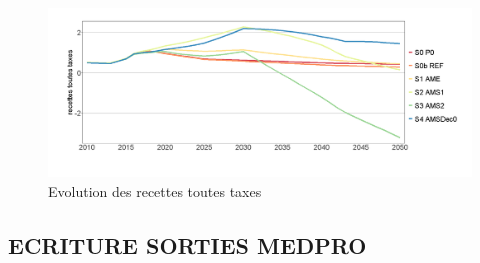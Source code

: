 \documentclass[]{article}
\begin{document}
\begin{figure}
\centering
\includegraphics{Exemple_sortiestertiaire_files/figure-latex/Evol_Recettes_taxes-1.png}
\caption{Evolution des recettes toutes taxes}
\end{figure}

\subsection{ECRITURE SORTIES MEDPRO}\label{ecriture-sorties-medpro}
\end{document}
